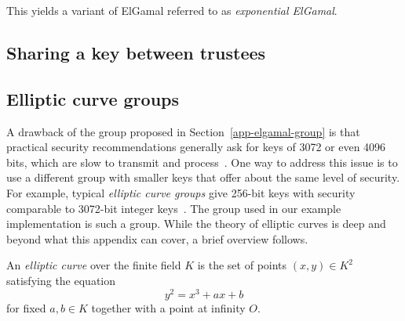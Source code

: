 \documentclass[12pt,a4paper]{article}
\theoremstyle{definition}
\begin{document}
This yields a variant of ElGamal referred to as \textit{exponential ElGamal}.
\subsection{Sharing a key between trustees}

\subsection{Elliptic curve groups}
A drawback of the group proposed in Section~\ref{app-elgamal-group} is that practical security recommendations generally ask for keys of 3072 or even 4096 bits, which are slow to transmit and process~\cite{barker2018transitioning}. One way to address this issue is to use a different group with smaller keys that offer about the same level of security. For example, typical \textit{elliptic curve groups} give 256-bit keys with security comparable to 3072-bit integer keys~\cite{bafandehkar2013comparison}. The group used in our example implementation is such a group. While the theory of elliptic curves is deep and beyond what this appendix can cover, a brief overview follows.

\begin{definition}
    An \textit{elliptic curve} over the finite field $K$ is the set of points $(x, y)\in K^2$ satisfying the equation
    $$y^2 = x^3 + ax + b$$
    for fixed $a, b\in K$ together with a point at infinity $O$.
\end{definition}
\end{document}
